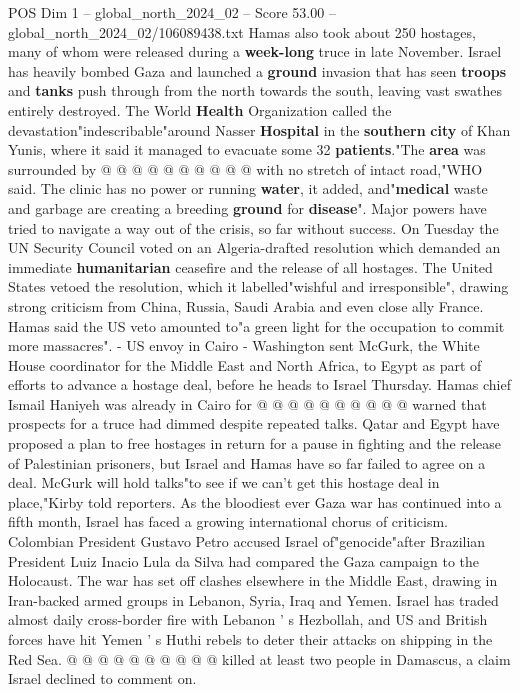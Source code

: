 \begin{textsample}{POS Dim 1 – global\_north\_2024\_02 – Score 53.00 – global\_north\_2024\_02/106089438.txt}
Hamas also took about 250 hostages, many of whom were released during a \textbf{week-long} truce in late November.
Israel has heavily bombed Gaza and launched a \textbf{ground} invasion that has seen \textbf{troops} and \textbf{tanks} push through from the north towards the south, leaving vast swathes entirely destroyed.
The World \textbf{Health} Organization called the devastation"indescribable"around Nasser \textbf{Hospital} in the \textbf{southern} \textbf{city} of Khan Yunis, where it said it managed to evacuate some 32 \textbf{patients}."The \textbf{area} was surrounded by @ @ @ @ @ @ @ @ @ @ with no stretch of intact road,"WHO said.
The clinic has no power or running \textbf{water}, it added, and"\textbf{medical} waste and garbage are creating a breeding \textbf{ground} for \textbf{disease}".
Major powers have tried to navigate a way out of the crisis, so far without success.
On Tuesday the UN Security Council voted on an Algeria-drafted resolution which demanded an immediate \textbf{humanitarian} ceasefire and the release of all hostages.
The United States vetoed the resolution, which it labelled"wishful and irresponsible", drawing strong criticism from China, Russia, Saudi Arabia and even close ally France.
Hamas said the US veto amounted to"a green light for the occupation to commit more massacres". - US envoy in Cairo - Washington sent McGurk, the White House coordinator for the Middle East and North Africa, to Egypt as part of efforts to advance a hostage deal, before he heads to Israel Thursday.
Hamas chief Ismail Haniyeh was already in Cairo for @ @ @ @ @ @ @ @ @ @ warned that prospects for a truce had dimmed despite repeated talks.
Qatar and Egypt have proposed a plan to free hostages in return for a pause in fighting and the release of Palestinian prisoners, but Israel and Hamas have so far failed to agree on a deal.
McGurk will hold talks"to see if we can't get this hostage deal in place,"Kirby told reporters.
As the bloodiest ever Gaza war has continued into a fifth month, Israel has faced a growing international chorus of criticism.
Colombian President Gustavo Petro accused Israel of"genocide"after Brazilian President Luiz Inacio Lula da Silva had compared the Gaza campaign to the Holocaust.
The war has set off clashes elsewhere in the Middle East, drawing in Iran-backed armed groups in Lebanon, Syria, Iraq and Yemen.
Israel has traded almost daily cross-border fire with Lebanon ' s Hezbollah, and US and British forces have hit Yemen ' s Huthi rebels to deter their attacks on shipping in the Red Sea. @ @ @ @ @ @ @ @ @ @ killed at least two people in Damascus, a claim Israel declined to comment on.

\end{textsample}
